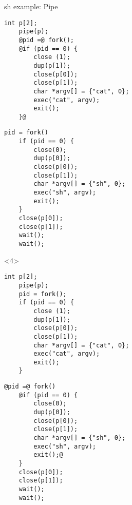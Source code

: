 \begin{frame}[fragile]{sh example: Pipe}
\begin{onlyenv}
\begin{minipage}[t]{2.2in}
\begin{lstlisting}[frame=single]
	int p[2];
	pipe(p);
	@pid =@ fork();
	@if (pid == 0) {
		close (1);
		dup(p[1]);
		close(p[0]);
		close(p[1]);
		char *argv[] = {"cat", 0};
		exec("cat", argv);
		exit();
	}@
\end{lstlisting}
\end{minipage}
\begin{minipage}[t]{2.3in}
\begin{lstlisting}[frame=single]
	pid = fork()
	if (pid == 0) {
		close(0);
		dup(p[0]);
		close(p[0]);
		close(p[1]);
		char *argv[] = {"sh", 0};
		exec("sh", argv);
		exit();	
	}
	close(p[0]);
	close(p[1]);
	wait();
	wait();
\end{lstlisting}
\end{minipage}
\end{onlyenv}
\begin{onlyenv}<4>
\begin{minipage}[t]{2.2in}
\begin{lstlisting}[frame=single]
	int p[2];
	pipe(p);
	pid = fork();
	if (pid == 0) {
		close (1);
		dup(p[1]);
		close(p[0]);
		close(p[1]);
		char *argv[] = {"cat", 0};
		exec("cat", argv);
		exit();
	}
\end{lstlisting}
\end{minipage}
\begin{minipage}[t]{2.3in}
\begin{lstlisting}[frame=single]
	@pid =@ fork()
	@if (pid == 0) {
		close(0);
		dup(p[0]);
		close(p[0]);
		close(p[1]);
		char *argv[] = {"sh", 0};
		exec("sh", argv);
		exit();@	
	}
	close(p[0]);
	close(p[1]);
	wait();
	wait();
\end{lstlisting}
\end{minipage}
\end{onlyenv}
\end{frame}
%
%
